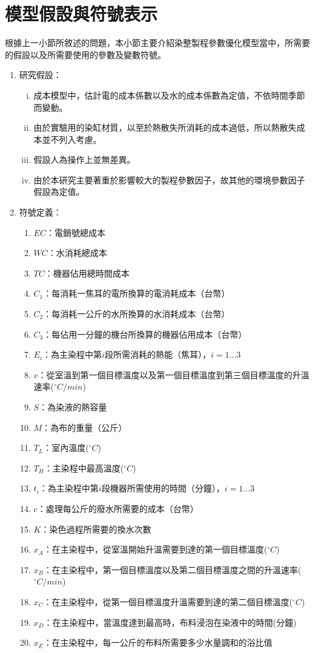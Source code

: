 \section{模型假設與符號表示}
\label{c:ch4.2}
根據上一小節所敘述的問題，本小節主要介紹染整製程參數優化模型當中，所需要的假設以及所需要使用的參數及變數符號。
\begin{enumerate}[(1)]
	\item 研究假設：
	\begin{enumerate}[i. ]
		\item 成本模型中，估計電的成本係數以及水的成本係數為定值，不依時間季節而變動。
		\item 由於實驗用的染缸材質，以至於熱散失所消耗的成本過低，所以熱散失成本並不列入考慮。
		\item 假設人為操作上並無差異。
		\item 由於本研究主要著重於影響較大的製程參數因子，故其他的環境參數因子假設為定值。
	\end{enumerate}
	\item 符號定義：
	\begin{enumerate}[]
		\item $EC$：電銷號總成本
		\item $WC$：水消耗總成本
		\item $TC$：機器佔用總時間成本
		\item $C_1$：每消耗一焦耳的電所換算的電消耗成本（台幣）
		\item $C_2$：每消耗一公斤的水所換算的水消耗成本（台幣）
		\item $C_3$：每佔用一分鐘的機台所換算的機器佔用成本（台幣）
		\item $E_i$：為主染程中第$i$段所需消耗的熱能（焦耳），$i=1\ldots3$
		\item $v$：從室溫到第一個目標溫度以及第一個目標溫度到第三個目標溫度的升溫速率($^\circ C/min$)
		\item $S$：為染液的熱容量
		\item $M$：為布的重量（公斤）
		\item $T_L$：室內溫度($^\circ C$)
		\item $T_H$：主染程中最高溫度($^\circ C$)
		\item $t_i$：為主染程中第$i$段機器所需使用的時間（分鐘），$i=1\ldots3$
		\item $c$：處理每公斤的廢水所需要的成本（台幣）
		\item $K$：染色過程所需要的換水次數
		\item $x_A$：在主染程中，從室溫開始升溫需要到達的第一個目標溫度($^\circ C$)
		\item $x_B$：在主染程中，第一個目標溫度以及第二個目標溫度之間的升溫速率($^\circ C/min$)
		\item $x_C$：在主染程中，從第一個目標溫度升溫需要到達的第二個目標溫度($^\circ C$)
		\item $x_D$：在主染程中，當溫度達到最高時，布料浸泡在染液中的時間(分鐘)
		\item $x_E$：在主染程中，每一公斤的布料所需要多少水量調和的浴比值
	\end{enumerate}
\end{enumerate}
